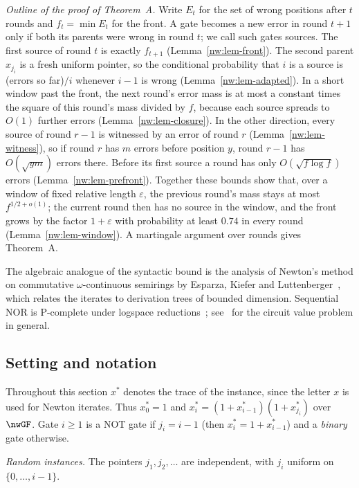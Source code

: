 \documentclass[11pt]{amsart}
\theoremstyle{definition}
\theoremstyle{remark}
\newcommand{\eps}{\varepsilon}
\begin{document}
\emph{Outline of the proof of Theorem~A.} Write $E_t$ for the set of wrong
positions after $t$ rounds and $f_t=\min E_t$ for the front. A gate becomes a
new error in round $t+1$ only if both its parents were wrong in round $t$; we
call such gates sources. The first source of round $t$ is exactly $f_{t+1}$
(Lemma~\ref{nw:lem-front}). The second parent $x_{j_i}$ is a fresh uniform
pointer, so the conditional probability that $i$ is a source is (errors so
far)$/i$ whenever $i-1$ is wrong (Lemma~\ref{nw:lem-adapted}). In a short
window past the front, the next round's error mass is at most a constant
times the square of this round's mass divided by $f$, because each source
spreads to $O(1)$ further errors (Lemma~\ref{nw:lem-closure}). In the other
direction, every source of round $r-1$ is witnessed by an error of round $r$
(Lemma~\ref{nw:lem-witness}), so if round $r$ has $m$ errors before position
$y$, round $r-1$ has $O(\sqrt{ym})$ errors there. Before its first source a
round has only $O(\sqrt{f\log f})$ errors (Lemma~\ref{nw:lem-prefront}).
Together these bounds show that, over a window of fixed relative length
$\eps$, the previous round's mass stays at most $f^{1/2+o(1)}$; the current
round then has no source in the window, and the front grows by the factor
$1+\eps$ with probability at least $0.74$ in every round
(Lemma~\ref{nw:lem-window}). A martingale argument over rounds gives
Theorem~A.

The algebraic analogue of the syntactic bound is the analysis of Newton's
method on commutative $\omega$-continuous semirings by Esparza, Kiefer and
Luttenberger~\cite{nw-ekl10}, which relates the iterates to derivation trees
of bounded dimension. Sequential NOR is P-complete under logspace
reductions~\cite{okhotin}; see~\cite{ghr,gb-ladner} for the circuit value
problem in general.

\subsection{Setting and notation}\label{nw:sec-setting}

Throughout this section $x^*$ denotes the trace of the instance, since the
letter $x$ is used for Newton iterates. Thus $x^*_0=1$ and
$x^*_i=(1+x^*_{i-1})(1+x^*_{j_i})$ over $\nwGF$. Gate $i\ge1$ is a NOT gate if
$j_i=i-1$ (then $x^*_i=1+x^*_{i-1}$) and a \emph{binary} gate otherwise.

\emph{Random instances.} The pointers $j_1,j_2,\dots$ are independent, with
$j_i$ uniform on $\{0,\dots,i-1\}$.
\end{document}
